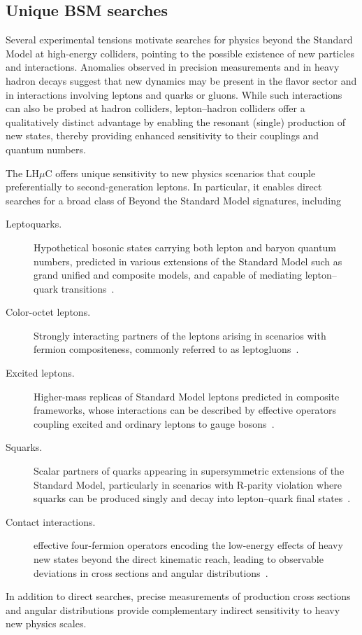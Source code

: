 \documentclass[a4paper,11pt]{article}
\begin{document}
\subsection{Unique BSM searches}

Several experimental tensions motivate searches for physics beyond the Standard Model at high-energy colliders, pointing to the possible existence of new particles and interactions. Anomalies observed in precision measurements and in heavy hadron decays suggest that new dynamics may be present in the flavor sector and in interactions involving leptons and quarks or gluons. While such interactions can
also be probed at hadron colliders, lepton--hadron colliders offer a qualitatively distinct advantage by enabling the resonant (single) production of new states, thereby providing enhanced sensitivity to their couplings and quantum numbers.

The LH$\mu$C offers unique sensitivity to new physics scenarios that couple preferentially to second-generation leptons. In particular, it enables direct searches for a broad class of Beyond the Standard Model signatures, including

\begin{description}
\item[Leptoquarks.] Hypothetical bosonic states carrying both lepton and baryon quantum numbers, predicted in various extensions of the Standard Model such as grand unified and composite models, and capable of mediating lepton--quark transitions~\cite{Pati:1974yy, Buchmuller:1986zs}.

\item[Color-octet leptons.] Strongly interacting partners of the leptons arising in scenarios with fermion compositeness, commonly referred to as leptogluons~\cite{Sahin:2010dd, Acar:2016rsw}.

\item[Excited leptons.] Higher-mass replicas of
Standard Model leptons predicted in composite frameworks, whose interactions can be described by effective operators coupling excited and ordinary leptons to gauge bosons~\cite{Terazawa:1981eg, Hagiwara:1985wt, Caliskan:2017meb}.

\item[Squarks.] Scalar partners of quarks appearing in supersymmetric extensions of the Standard Model, particularly in scenarios with R-parity violation where squarks can be produced singly and decay into lepton--quark final states~\cite{Beenakker:1996ch}.

\item[Contact interactions.] effective four-fermion operators encoding the low-energy effects of heavy new states beyond the direct kinematic reach, leading to observable deviations in cross sections and angular distributions~\cite{Eichten:1983hw, H1:2011ije}.
\end{description}
In addition to direct searches, precise measurements of production cross sections and angular distributions provide complementary indirect sensitivity to heavy new physics scales.
\end{document}
